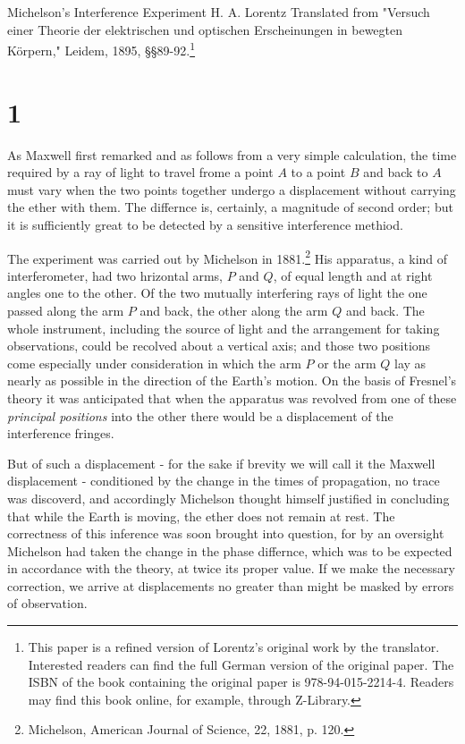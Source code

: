\paperheader
    {Michelson's Interference Experiment}
    {H. A. Lorentz}
    {Translated from "Versuch einer Theorie der elektrischen und optischen Erscheinungen in bewegten Körpern," Leidem, 1895, \S\S 89-92.\footnote{This paper is a refined version of Lorentz's original work by the translator. Interested readers can find the full German version of the original paper. The ISBN of the book containing the original paper is 978-94-015-2214-4. Readers may find this book online, for example, through Z-Library.}}


\section*{1}
As Maxwell first remarked and as follows from a very simple calculation, the time required by a ray of light to travel frome a point $A$ to a point $B$ and back to $A$ must vary when the two points together undergo a displacement without carrying the ether with them. The differnce is, certainly, a magnitude of second order; but it is sufficiently great to be detected by a sensitive interference methiod.

The experiment was carried out by Michelson in 1881.\footnote{Michelson, American Journal of Science, 22, 1881, p. 120.} His apparatus, a kind of interferometer, had two hrizontal arms, $P$ and $Q$, of equal length and at right angles one to the other. Of the two mutually interfering rays of light the one passed along the arm $P$ and back, the other along the arm $Q$ and back. The whole instrument, including the source of light and the arrangement for taking observations, could be recolved about a vertical axis; and those two positions come especially under consideration in which the arm $P$ or the arm $Q$ lay as nearly as possible in the direction of the Earth's motion. On the basis of Fresnel's theory it was anticipated that when the apparatus was revolved from one of these \textit{principal positions} into the other there would be a displacement of the interference fringes.

But of such a displacement - for the sake if brevity we will call it the Maxwell displacement - conditioned by the change in the times of propagation, no trace was discoverd, and accordingly Michelson thought himself justified in concluding that while the Earth is moving, the ether does not remain at rest. The correctness of this inference was soon brought into question, for by an oversight Michelson had taken the change in the phase differnce, which was to be expected in accordance with the theory, at twice its proper value. If we make the necessary correction, we arrive at displacements no greater than might be masked by errors of observation.

